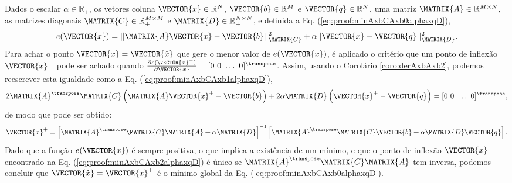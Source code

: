 \begin{myproofT}
\label{proof:theo:minAxbCAxbalphaxqD}
Dados
o escalar $\alpha \in \mathbb{R}_{+}$,
os vetores coluna $\VECTOR{x}\in \mathbb{R}^N$, $\VECTOR{b}\in \mathbb{R}^M$ e $\VECTOR{q}\in \mathbb{R}^N$,  
uma matriz $\MATRIX{A} \in \mathbb{R}^{M\times N}$, 
as matrizes diagonais $\MATRIX{C} \in \mathbb{R}^{M\times M}_+$ e $\MATRIX{D} \in \mathbb{R}^{N\times N}_+$, e 
definida a Eq. (\ref{eq:proof:minAxbCAxb0alphaxqD}),
\begin{equation}\label{eq:proof:minAxbCAxb0alphaxqD}
e(\VECTOR{x})=||\MATRIX{A}\VECTOR{x}-\VECTOR{b}||_{\MATRIX{C}}^2+\alpha||\VECTOR{x}-\VECTOR{q}||_{\MATRIX{D}}^2.
\end{equation}
Para achar o ponto $\VECTOR{x}=\VECTOR{\hat{x}}$ que gere o menor valor de $e(\VECTOR{x})$, é aplicado
o critério que um ponto de inflexão $\VECTOR{x}^+$ pode ser achado quando 
$\frac{\partial e(\VECTOR{x}^+)}{\partial \VECTOR{x} }=[0~ 0~ \hdots~ 0 ]^{\transpose}$.
Assim, usando o Corolário \ref{coro:derAxbAxb2}, podemos 
reescrever esta igualdade como a Eq. (\ref{eq:proof:minAxbCAxb1alphaxqD}),
\begin{equation}\label{eq:proof:minAxbCAxb1alphaxqD}
2 \MATRIX{A}^{\transpose}\MATRIX{C}\left(\MATRIX{A}\VECTOR{x}^+-\VECTOR{b}\right)
+2 \alpha\MATRIX{D}\left(\VECTOR{x}^+-\VECTOR{q}\right)=[0~ 0~ \hdots~ 0 ]^{\transpose},
\end{equation}
de modo que pode ser obtido:
\begin{equation}\label{eq:proof:minAxbCAxb2alphaxqD}
\VECTOR{x}^+=\left[ \MATRIX{A}^{\transpose}\MATRIX{C}\MATRIX{A} +\alpha\MATRIX{D}\right]^{-1} 
\left[ \MATRIX{A}^{\transpose}\MATRIX{C} \VECTOR{b}+\alpha\MATRIX{D}\VECTOR{q}\right].
\end{equation}
Dado que  a função $e(\VECTOR{x})$ é sempre positiva, o que implica a existência de um mínimo,
e que o ponto de inflexão $\VECTOR{x}^+$ encontrado na Eq. (\ref{eq:proof:minAxbCAxb2alphaxqD}) 
é único se $\MATRIX{A}^{\transpose}\MATRIX{C}\MATRIX{A}$ tem inversa, 
podemos concluir que  $\VECTOR{\hat{x}}=\VECTOR{x}^+$ é o mínimo global da Eq. (\ref{eq:proof:minAxbCAxb0alphaxqD}).
\end{myproofT}

